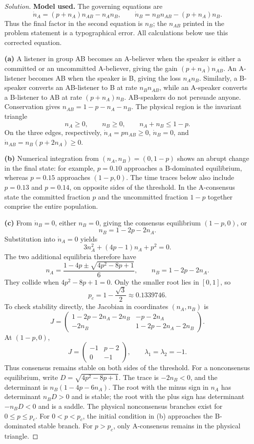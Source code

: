 \documentclass[10pt]{amsart}
\newenvironment{solution}
{\begin{proof}[Solution]}
{\end{proof}}
\begin{document}
\begin{onehalfspace}
        \begin{solution}

\textbf{Model used.} The governing equations are
\[
 \dot n_A=(p+n_A)n_{AB}-n_A n_B,\qquad
 \dot n_B=n_B n_{AB}-(p+n_A)n_B.
\]
Thus the final factor in the second equation is $n_B$; the $n_{AB}$ printed in the problem statement is a typographical error. All calculations below use this corrected equation.

\textbf{(a)} A listener in group AB becomes an A-believer when the speaker is either a committed or an uncommitted A-believer, giving the gain $(p+n_A)n_{AB}$. An A-listener becomes AB when the speaker is B, giving the loss $n_A n_B$. Similarly, a B-speaker converts an AB-listener to B at rate $n_B n_{AB}$, while an A-speaker converts a B-listener to AB at rate $(p+n_A)n_B$. AB-speakers do not persuade anyone. Conservation gives $n_{AB}=1-p-n_A-n_B$. The physical region is the invariant triangle
\[
 n_A\geq0,\qquad n_B\geq0,\qquad n_A+n_B\leq1-p.
\]
On the three edges, respectively, $\dot n_A=p n_{AB}\geq0$, $\dot n_B=0$, and $\dot n_{AB}=n_B(p+2n_A)\geq0$.

\textbf{(b)} Numerical integration from $(n_A,n_B)=(0,1-p)$ shows an abrupt change in the final state: for example, $p=0.10$ approaches a B-dominated equilibrium, whereas $p=0.15$ approaches $(1-p,0)$. The time traces below also include $p=0.13$ and $p=0.14$, on opposite sides of the threshold. In the A-consensus state the committed fraction $p$ and the uncommitted fraction $1-p$ together comprise the entire population.

\textbf{(c)} From $\dot n_B=0$, either $n_B=0$, giving the consensus equilibrium $(1-p,0)$, or
\[
 n_B=1-2p-2n_A.
\]
Substitution into $\dot n_A=0$ yields
\[
 3n_A^2+(4p-1)n_A+p^2=0.
\]
The two additional equilibria therefore have
\[
 n_A=\frac{1-4p\pm\sqrt{4p^2-8p+1}}6,
 \qquad n_B=1-2p-2n_A.
\]
They collide when $4p^2-8p+1=0$. Only the smaller root lies in $[0,1]$, so
\[
 p_c=1-\frac{\sqrt3}{2}\approx0.1339746.
\]
To check stability directly, the Jacobian in coordinates $(n_A,n_B)$ is
\[
 J=\begin{pmatrix}
 1-2p-2n_A-2n_B&-p-2n_A\\
 -2n_B&1-2p-2n_A-2n_B
 \end{pmatrix}.
\]
At $(1-p,0)$,
\[
 J=\begin{pmatrix}-1&p-2\\0&-1\end{pmatrix},
 \qquad \lambda_1=\lambda_2=-1.
\]
Thus consensus remains stable on both sides of the threshold. For a nonconsensus equilibrium, write $D=\sqrt{4p^2-8p+1}$. The trace is $-2n_B<0$, and the determinant is $n_B(1-4p-6n_A)$. The root with the minus sign in $n_A$ has determinant $n_BD>0$ and is stable; the root with the plus sign has determinant $-n_BD<0$ and is a saddle. The physical nonconsensus branches exist for $0\leq p\leq p_c$. For $0<p<p_c$, the initial condition in (b) approaches the B-dominated stable branch. For $p>p_c$, only A-consensus remains in the physical triangle.


\end{solution}
\end{onehalfspace}
\end{document}
